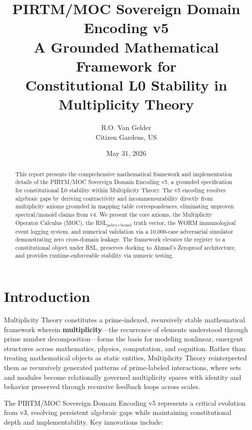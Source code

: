 \documentclass[11pt,a4paper]{article}
\title{\textbf{PIRTM/MOC Sovereign Domain Encoding v5}\\[0.5em]
\large A Grounded Mathematical Framework for \\ Constitutional L0 Stability in Multiplicity Theory}
\author{R.O. Van Gelder\\Citizen Gardens, US}
\date{May 31, 2026}
\begin{document}
\maketitle

\begin{abstract}
This report presents the comprehensive mathematical framework and implementation details of the PIRTM/MOC Sovereign Domain Encoding v5, a grounded specification for constitutional L0 stability within Multiplicity Theory. The v5 encoding resolves algebraic gaps by deriving contractivity and incommensurability directly from multiplicity axioms grounded in mapping table correspondences, eliminating unproven spectral/monoid claims from v4. We present the core axioms, the Multiplicity Operator Calculus (MOC), the RSL$_{\text{policy+bound}}$ truth vector, the WORM immunological event logging system, and numerical validation via a 10,000-case adversarial simulator demonstrating zero cross-domain leakage. The framework elevates the registry to a constitutional object under RSL, preserves docking to Ahmad's Zeroproof architecture, and provides runtime-enforceable stability via numeric testing.
\end{abstract}
\newpage
\tableofcontents
\newpage

\section{Introduction}

Multiplicity Theory constitutes a prime-indexed, recursively stable mathematical framework wherein \textbf{multiplicity}---the recurrence of elements understood through prime number decomposition---forms the basis for modeling nonlinear, emergent structures across mathematics, physics, computation, and cognition. Rather than treating mathematical objects as static entities, Multiplicity Theory reinterpreted them as recursively generated patterns of prime-labeled interactions, where sets and modules become relationally governed multiplicity spaces with identity and behavior preserved through recursive feedback loops across scales.

The PIRTM/MOC Sovereign Domain Encoding v5 represents a critical evolution from v3, resolving persistent algebraic gaps while maintaining constitutional depth and implementability. Key innovations include:
\end{document}
